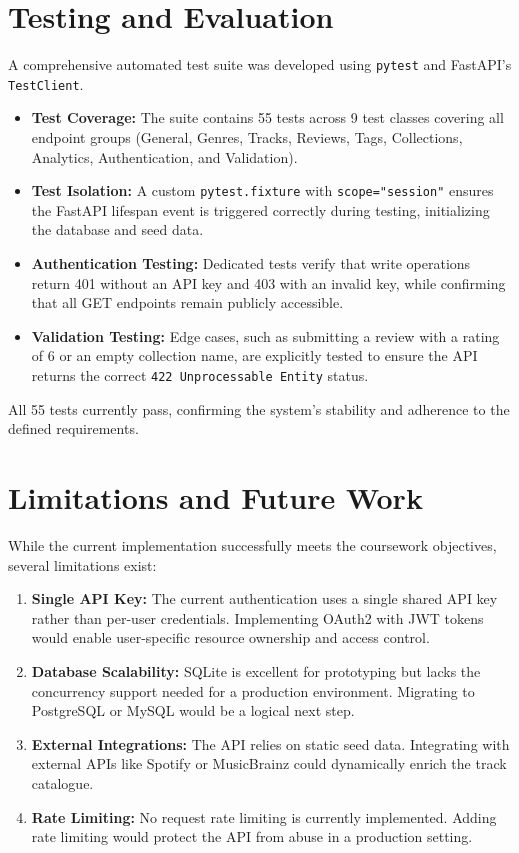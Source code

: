 \documentclass[11pt,a4paper]{article}
\begin{document}
\section{Testing and Evaluation}

A comprehensive automated test suite was developed using \texttt{pytest} and FastAPI's \texttt{TestClient}. 

\begin{itemize}[label=\textcolor{primary}{\textbullet}, noitemsep]
    \item \textbf{Test Coverage:} The suite contains 55 tests across 9 test classes covering all endpoint groups (General, Genres, Tracks, Reviews, Tags, Collections, Analytics, Authentication, and Validation).
    \item \textbf{Test Isolation:} A custom \texttt{pytest.fixture} with \texttt{scope="session"} ensures the FastAPI lifespan event is triggered correctly during testing, initializing the database and seed data.
    \item \textbf{Authentication Testing:} Dedicated tests verify that write operations return 401 without an API key and 403 with an invalid key, while confirming that all GET endpoints remain publicly accessible.
    \item \textbf{Validation Testing:} Edge cases, such as submitting a review with a rating of 6 or an empty collection name, are explicitly tested to ensure the API returns the correct \texttt{422 Unprocessable Entity} status.
\end{itemize}

All 55 tests currently pass, confirming the system's stability and adherence to the defined requirements.

\section{Limitations and Future Work}

While the current implementation successfully meets the coursework objectives, several limitations exist:
\begin{enumerate}[label=\textbf{\textcolor{primary}{\arabic*.}}, noitemsep]
    \item \textbf{Single API Key:} The current authentication uses a single shared API key rather than per-user credentials. Implementing OAuth2 with JWT tokens would enable user-specific resource ownership and access control.
    \item \textbf{Database Scalability:} SQLite is excellent for prototyping but lacks the concurrency support needed for a production environment. Migrating to PostgreSQL or MySQL would be a logical next step.
    \item \textbf{External Integrations:} The API relies on static seed data. Integrating with external APIs like Spotify or MusicBrainz could dynamically enrich the track catalogue.
    \item \textbf{Rate Limiting:} No request rate limiting is currently implemented. Adding rate limiting would protect the API from abuse in a production setting.
\end{enumerate}
\end{document}
